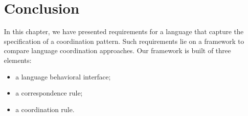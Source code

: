 \section{Conclusion}
In this chapter, we have presented requirements for a language that capture the specification of a coordination pattern. Such requirements lie on a framework to compare language coordination approaches. Our framework is built of three elements: 
\begin{itemize}
	\item a language behavioral interface;
	\item a correspondence rule;
	\item a coordination rule.
\end{itemize}


